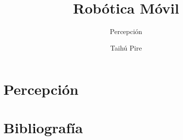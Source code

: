 \documentclass[aspectratio=169,compress]{beamer}
\subtitle{Percepción}
\title{Robótica Móvil}
\author{Taihú Pire}
\institute{}
\date{}
\begin{document}
\frame{\titlepage}

\section{Percepción}




























\section{Bibliografía}

\end{document}
